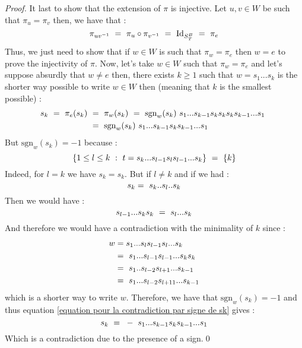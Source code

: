 \begin{proof}
	It last to show that the extension of $\pi$ is injective. Let $u,v\in W$ be such that $\pi_u=\pi_v$ then, we have that :
	\begin{equation}
	\pi_{uv^{-1}}\text{ }=\text{ } \pi_u\circ \pi_{v^{-1}}\text{ }=\text{ } \mbox{Id}_{S_T^B}\text{ }=\text{ }  \pi_e
	\end{equation}
	Thus, we just need to show that if $w\in W$ is such that $\pi_w=\pi_e$ then $w=e$ to prove the injectivity of $\pi$. Now, let's take $w\in W$ such that $\pi_w=\pi_e$ and let's suppose absurdly that $w\not=e$ then, there exists $k\geq 1$ such that $w=s_1...s_k$ is the shorter way possible to write $w\in W$ then (meaning that $k$ is the smallest possible) :
	\begin{equation}\label{equation pour la contradiction par signe de sk}
	\begin{split}
		s_k\text{ }=\text{ }\pi_e(s_k)\text{ }&=\text{ } \pi_w(s_k)\text{ } =\text{ }\mbox{sgn}_w(s_k)\text{ } s_1...s_{k-1}s_ks_ks_ks_{k-1}...s_1\text{ }\\
		&=\text{ }\mbox{sgn}_w(s_k)\text{ } s_1...s_{k-1}s_ks_{k-1}...s_1
	\end{split}
	\end{equation}
	But $\mbox{sgn}_w(s_k)=-1$ because :
	\begin{equation}
	\{1\leq l\leq k\text{ } :\text{ } t=s_k...s_{l-1}s_l s_{l-1}...s_k\}\text{ }=\text{ } \{k\}
	\end{equation} 
	Indeed, for $l=k$ we have $s_k=s_k$. But if $l\not=k$ and if we had :
	\begin{equation}
	s_k=\text{ } s_k..s_l..s_k
	\end{equation}
	Then we would have :
	\begin{equation}
	s_{l-1}...s_ks_k\text{ }=\text{ } s_l...s_k
	\end{equation}
	And therefore  we would have a contradiction with the minimality of $k$ since :
	\begin{equation}
	\begin{split}
	w&=s_1...s_ls_{l-1}s_l...s_k\text{ }\\
	&=\text{ } s_1...s_{l-1}s_{l-1}...s_ks_k\text{ }\\
	&=\text{ } s_1..s_{l-2}s_{l+1}...s_{k-1}\text{ }\\
	&=\text{ } s_1...s_{l-2}s_{l+11}...s_{k-1}
	\end{split}
	\end{equation}
	which is a shorter way to write $w$. Therefore, we have that $\mbox{sgn}_w(s_k)=-1$ and thus equation \ref{equation pour la contradiction par signe de sk} gives :
	\begin{equation}
			s_k\text{ }=\text{ } -\text{ }  s_1...s_{k-1}s_ks_{k-1}...s_1
	\end{equation}
	Which is a contradiction due to the presence of a sign.\qed
	\end{proof}
